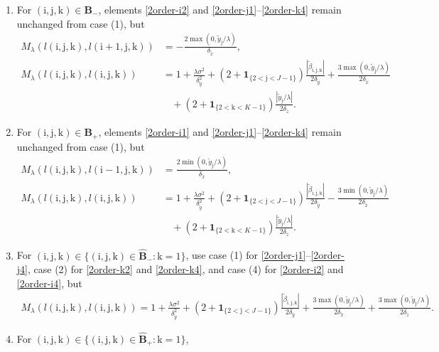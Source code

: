 \documentclass[12pt]{article}
\numberwithin{equation}{section}
\newcommand{\indic}{\mathbf{1}}
\newcommand{\ri}{\mathrm{i}}
\newcommand{\rj}{\mathrm{j}}
\newcommand{\rk}{\mathrm{k}}
\begin{document}
\begin{enumerate}[label = (\arabic*)]
\begin{align*}
	\end{align*}
	\item For $(\ri,\rj,\rk) \in \bm{B}_{-}$, 
	elements \eqref{2order-i2} and \eqref{2order-j1}--\eqref{2order-k4} remain unchanged from case (1), 
	but 
	\begin{align*}
		M_{\lambda}(l(\ri,\rj,\rk), l(\ri+1,\rj,\rk)) 
		&= -\frac{2\max(0, \tilde{y}_{\rj}/\lambda)}{\delta_{\tilde{x}}}, \\
		M_{\lambda}(l(\ri,\rj,\rk), l(\ri,\rj,\rk)) 
		&= 1 + \frac{\lambda\sigma^{2}}{\delta_{\tilde{y}}^{2}} 
		+ (2 +\indic_{\{2< \rj < J-1\}})\frac{|\tilde{\beta}_{\ri,\rj,\rk}|}{2\delta_{\tilde{y}}}
		+ \frac{3\max(0, \tilde{y}_{\rj}/\lambda)}{2\delta_{\tilde{x}}} \\
		&~~~~+ (2 +\indic_{\{2< \rk < K-1\}})\frac{|\tilde{y}_{\rj}/\lambda|}{2\delta_{\tilde{z}}}. 
	\end{align*}
	\item For $(\ri,\rj,\rk) \in \bm{B}_{+}$, 
	elements \eqref{2order-i1} and \eqref{2order-j1}--\eqref{2order-k4} remain unchanged from case (1), 
	but 
	\begin{align*}
		M_{\lambda}(l(\ri,\rj,\rk), l(\ri-1,\rj,\rk)) 
		&= \frac{2\min(0, \tilde{y}_{\rj}/\lambda)}{\delta_{\tilde{x}}}, \\
		M_{\lambda}(l(\ri,\rj,\rk), l(\ri,\rj,\rk)) 
		&=1 + \frac{\lambda\sigma^{2}}{\delta_{\tilde{y}}^{2}} 
		+ (2 +\indic_{\{2< \rj < J-1\}})\frac{|\tilde{\beta}_{\ri,\rj,\rk}|}{2\delta_{\tilde{y}}}
		- \frac{3\min(0, \tilde{y}_{\rj}/\lambda)}{2\delta_{\tilde{x}}} \\
		&~~~~+ (2 +\indic_{\{2< \rk < K-1\}})\frac{|\tilde{y}_{\rj}/\lambda|}{2\delta_{\tilde{z}}}. 
	\end{align*}
	\item For $(\ri,\rj,\rk) \in \{(\ri,\rj,\rk)\in \hat{\bm{B}}_{-}: \rk = 1\}$, 
	use case (1) for \eqref{2order-j1}--\eqref{2order-j4}, 
	case (2) for \eqref{2order-k2} and \eqref{2order-k4}, 
	and case (4) for \eqref{2order-i2} and \eqref{2order-i4}, 
	but 
	\begin{align*}
		M_{\lambda}(l(\ri,\rj,\rk), l(\ri,\rj,\rk)) 
		=1 + \frac{ \lambda\sigma^{2}}{\delta_{\tilde{y}}^{2}} 
		+ (2 +\indic_{\{2< \rj < J-1\}})\frac{|\tilde{\beta}_{\ri,\rj,\rk}|}{2\delta_{\tilde{y}}}
		+ \frac{3\max(0, \tilde{y}_{\rj}/\lambda)}{2\delta_{\tilde{x}}} 
		+ \frac{3\max(0, \tilde{y}_{\rj}/\lambda)}{2\delta_{\tilde{z}}}.
	\end{align*}
	\item For $(\ri,\rj,\rk) \in \{(\ri,\rj,\rk)\in \hat{\bm{B}}_{+}: \rk = 1\}$, 

\end{enumerate}
\end{document}

